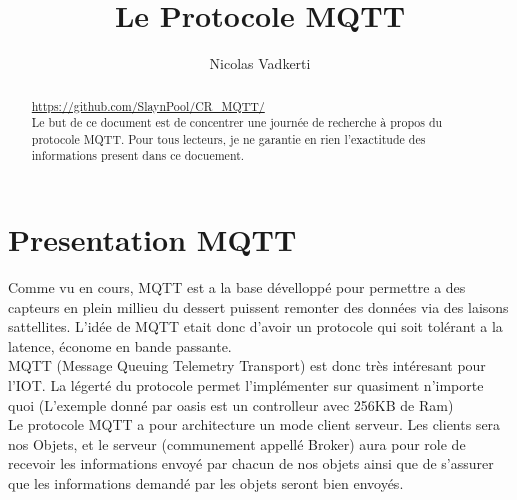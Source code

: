 \documentclass[a4paper,10pt]{article}
\title{Le Protocole MQTT}
\author{Nicolas Vadkerti}
\begin{document}
\maketitle
\begin{abstract}
 

\url{https://github.com/SlaynPool/CR_MQTT/}\\
Le but de ce document est de concentrer une journée de recherche à propos du protocole MQTT. Pour tous lecteurs, je ne garantie en rien l'exactitude des informations present dans ce docuement.
 
 
\end{abstract}



\section{Presentation MQTT}
Comme vu en cours, MQTT est a la base dévelloppé pour permettre a des capteurs en plein millieu du dessert puissent remonter des données via des laisons sattellites. L'idée de MQTT etait donc d'avoir un protocole qui soit tolérant a la latence, économe en bande passante.\\
MQTT (Message Queuing Telemetry Transport) est donc très intéresant pour l'IOT. La légerté du protocole permet  l'implémenter sur quasiment n'importe quoi (L'exemple donné par oasis est un controlleur avec 256KB de Ram)\\
Le protocole MQTT a pour architecture un mode client serveur. Les clients sera nos Objets, et le serveur (communement appellé Broker) aura pour role de recevoir les informations envoyé par chacun de nos objets ainsi que de s'assurer que les informations demandé par les objets seront bien envoyés.
\end{document}
